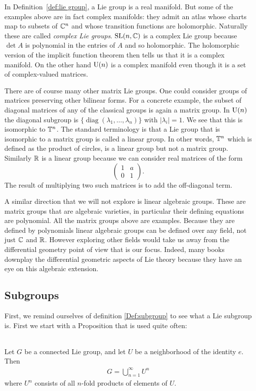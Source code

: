 In Definition~\ref{def:lie group}, a Lie group is a real manifold.
But some of the examples above are in fact complex manifolds: they admit an atlas whose charts map to subsets of $\mathbb{C}^n$ and whose transition functions are holomorphic.
Naturally these are called \emph{complex Lie groups}.
$\mathrm{SL}(n,\mathbb{C})$ is a complex Lie group because $\det A$ is polynomial in the entries of $A$ and so holomorphic.
The holomorphic version of the implicit function theorem then tells us that it is a complex manifold.
On the other hand $\mathrm{U}(n)$ is a complex manifold even though it is a set of complex-valued matrices.


There are of course many other matrix Lie groups.
One could consider groups of matrices preserving other bilinear forms. 
For a concrete example, the subset of diagonal matrices of any of the classical groups is again a matrix group.
In $\mathrm{U}(n)$ the diagonal subgroup is $\{\operatorname{diag}(\lambda_1,\dots,\lambda_n)\}$ with $|\lambda_i| = 1$.
We see that this is isomorphic to $\mathbb{T}^n$.
The standard terminology is that a Lie group that is isomorphic to a matrix group is called a linear group.
In other words, $\mathbb{T}^n$ which is defined as the product of circles, is a linear group but not a matrix group.
Similarly $\mathbb{R}$ is a linear group because we can consider real matrices of the form
\[
\begin{pmatrix}
1 & a \\
0 & 1
\end{pmatrix}.
\]
The result of multiplying two such matrices is to add the off-diagonal term.

A similar direction that we will not explore is linear algebraic groups.
These are matrix groups that are algebraic varieties, in particular their defining equations are polynomial.
All the matrix groups above are examples.
Because they are defined by polynomials linear algebraic groups can be defined over any field, not just $\mathbb{C}$ and $\mathbb{R}$.
However exploring other fields would take us away from the differential geometry point of view that is our focus.
Indeed, many books downplay the differential geometric aspects of Lie theory because they have an eye on this algebraic extension.






\subsection{Subgroups}
First, we remind ourselves of definition \ref{Def:subgroup} to see what a Lie subgroup is. 
First we start with a Proposition that is used quite often:
\begin{Prop}
\textup{\cite[3.18]{Warner1983}}\\
Let $G$ be a connected Lie group, and let $U$ be a neighborhood of the identity $e$. Then 
\begin{align*}
G= \bigcup_{n=1}^{\infty} U^n
\end{align*}
where $U^n$ consists of all $n$-fold products of elements of $U$.
\end{Prop}

